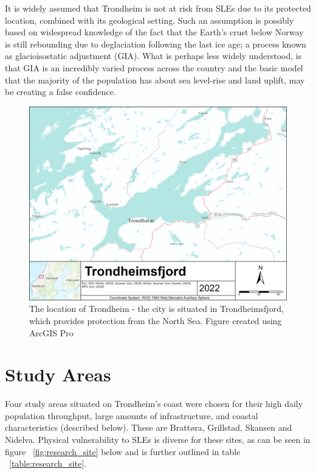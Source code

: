 It is widely assumed that Trondheim is not at risk from SLEs due to its protected location, combined with its geological setting. Such an assumption is possibly based on widespread knowledge of the fact that the Earth's crust below Norway is still rebounding due to deglaciation following the last ice age; a process known as glacioisostatic adjustment (GIA). What is perhaps less widely understood, is that GIA is an incredibly varied process across the country and the basic model that the majority of the population has about sea level-rise and land uplift, may be creating a false confidence.  

\begin{figure}[h!]
    \centering
    \includegraphics[width=1.0\textwidth]{fig/Trondheimsfjord.png}
    \caption{The location of Trondheim - the city is situated in Trondheimsfjord, which provides protection from the North Sea. Figure created using ArcGIS Pro}
    \label{fig:research_area}
\end{figure}



\section{Study Areas}
Four study areas situated on Trondheim's coast were chosen for their high daily population throughput, large amounts of infrastructure, and coastal characteristics (described below). These are Brattøra, Grillstad, Skansen and Nidelva. Physical vulnerability to SLEs is diverse for these sites, as can be seen in figure ~\ref{fig:research_site} below and is further outlined in table ~\ref{table:research_site}. 
